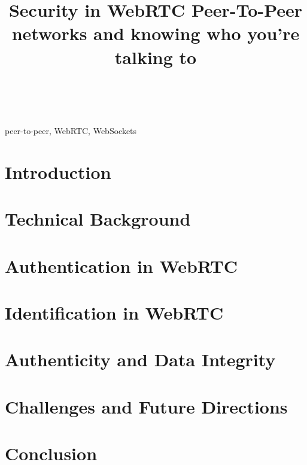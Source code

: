 \documentclass[conference]{IEEEtran}
\begin{document}
\title{Security in WebRTC Peer-To-Peer networks and knowing who you're talking to\\
}

\author{
 \\
\textit{}
}

\maketitle

\begin{abstract}
\end{abstract}

\begin{IEEEkeywords}
peer-to-peer, WebRTC, WebSockets
\end{IEEEkeywords}

\section{Introduction}

\section{Technical Background}

\section{Authentication in WebRTC}

\section{Identification in WebRTC}

\section{Authenticity and Data Integrity}

\section{Challenges and Future Directions}

\section{Conclusion}

\begin{thebibliography}{00}
\end{thebibliography}
\end{document}
